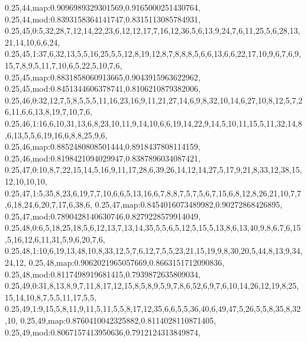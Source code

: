 0.25,44,map:0.9096989329301569,0.9165000251430764,
0.25,44,mod:0.8393158364141747,0.8315113085784931,
0.25,45,0:5,32,28,7,12,14,22,23,6,12,12,17,7,16,12,36,5,6,13,9,24,7,6,11,25,5,6,28,13,21,14,10,6,6,24,
0.25,45,1:37,6,32,13,5,5,16,25,5,5,12,8,19,12,8,7,8,8,8,5,6,6,13,6,6,22,17,10,9,6,7,6,9,15,7,8,9,5,11,7,10,6,5,22,5,10,7,6,
0.25,45,map:0.8831858060913665,0.9043915963622962,
0.25,45,mod:0.8451344606378741,0.8106210879382006,
0.25,46,0:32,12,7,5,8,5,5,5,11,16,23,16,9,11,21,27,14,6,9,8,32,10,14,6,27,10,8,12,5,7,26,11,6,6,13,8,19,7,10,7,6,
0.25,46,1:16,6,10,31,13,6,8,23,10,11,9,14,10,6,6,19,14,22,9,14,5,10,11,15,5,11,32,14,8,6,13,5,5,6,19,16,6,8,8,25,9,6,
0.25,46,map:0.8852480808501444,0.8918437808114159,
0.25,46,mod:0.8198421094029947,0.8387896034087421,
0.25,47,0:10,8,7,22,15,14,5,16,9,11,17,28,6,39,26,14,12,14,27,5,17,9,21,8,33,12,38,15,12,10,10,10,
0.25,47,1:5,35,8,23,6,19,7,7,10,6,6,5,13,16,6,7,8,8,7,5,7,5,6,7,15,6,8,12,8,26,21,10,7,7,6,18,24,6,20,7,17,6,38,6,
0.25,47,map:0.8454016073489982,0.90272868426895,
0.25,47,mod:0.7890428140630746,0.8279228579914049,
0.25,48,0:6,5,18,25,18,5,6,12,13,7,13,14,35,5,5,6,5,12,5,15,5,13,8,6,13,40,9,8,6,7,6,15,5,16,12,6,11,31,5,9,6,20,7,6,
0.25,48,1:10,6,19,13,48,10,8,33,12,5,7,6,12,7,5,5,23,21,15,19,9,8,30,20,5,44,8,13,9,34,24,12,
0.25,48,map:0.9062021965057669,0.8663151712090836,
0.25,48,mod:0.8117498919681415,0.7939872635809034,
0.25,49,0:31,8,13,8,9,7,11,8,17,12,15,8,5,8,9,5,9,7,8,6,52,6,9,7,6,10,14,26,12,19,8,25,15,14,10,8,7,5,5,11,17,5,5,
0.25,49,1:9,15,5,8,11,9,11,5,11,5,5,8,17,12,35,6,6,5,5,36,40,6,49,47,5,26,5,5,8,35,8,32,10,
0.25,49,map:0.8760410042325882,0.8114028110871405,
0.25,49,mod:0.8067157413950636,0.7912124313849874,
